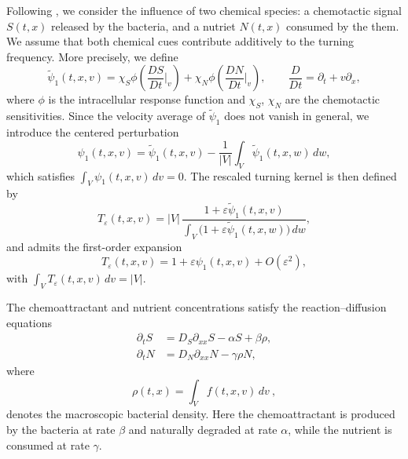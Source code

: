 \documentclass[11pt,twoside]{article}
\numberwithin{equation}{section}
\theoremstyle{plain}
\theoremstyle{nonumberplain}
\begin{document}
 Following \cite{saragosti2010mathematical}, we consider the influence of two chemical species: a chemotactic signal $S(t,x)$ released by the bacteria, and a nutriet $N(t,x)$ consumed by the them. We assume that both chemical cues contribute additively to the turning frequency. 
More precisely, we define
\[
\widetilde{\psi}_1(t,x,v)
=
\chi_S \phi\!\left(\frac{DS}{Dt}\Big|_v\right)
+
\chi_N \phi\!\left(\frac{DN}{Dt}\Big|_v\right),
\qquad
\frac{D}{Dt} = \partial_t + v \partial_x,
\]
where $\phi$ is the intracellular response function and $\chi_S$, $\chi_N$ are the
chemotactic sensitivities. Since the velocity average of $\widetilde{\psi}_1$ does not
vanish in general, we introduce the centered perturbation
\begin{equation}\label{eq: centered psi1}
\psi_1(t,x,v)
=
\widetilde{\psi}_1(t,x,v)
-
\frac1{|V|}\int_V \widetilde{\psi}_1(t,x,w)\,dw,
\end{equation}
which satisfies $\int_V \psi_1(t,x,v)\,dv = 0.$
The rescaled turning kernel is then defined by
\[
T_\varepsilon(t,x,v)
=
|V|\,
\frac{1+\varepsilon \widetilde{\psi}_1(t,x,v)}
{\displaystyle \int_V \bigl(1+\varepsilon \widetilde{\psi}_1(t,x,w)\bigr)\,dw},
\]
and admits the first-order expansion
\begin{equation}\label{eq: T expansion}
T_\varepsilon(t,x,v)=1+\varepsilon \psi_1(t,x,v)+O(\varepsilon^2),
\end{equation}
with
$\int_V T_\varepsilon(t,x,v)\,dv = |V|.$







 

The chemoattractant and nutrient concentrations satisfy the reaction--diffusion equations
\begin{subequations}
\label{eq:SN_intro}
\begin{align}
\partial_t S &= D_S \partial_{xx} S - \alpha S + \beta \rho, \\
\partial_t N &= D_N \partial_{xx} N - \gamma \rho N,
\end{align}
\end{subequations}
where
\[
\rho(t,x) = \int_V f(t,x,v)\,dv\ ,
\]
denotes the macroscopic bacterial density.
Here the chemoattractant is produced by the bacteria at rate $\beta$ and naturally degraded at rate $\alpha$, while the nutrient is consumed at rate $\gamma$.
\end{document}
